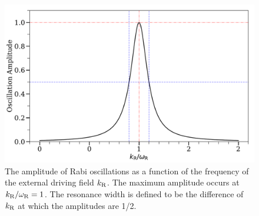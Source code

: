 \begin{figure}[htbp]
    \centering
    \includegraphics[width=\textwidth]{chapters/assets/app/rabi-resonance-width}
    \caption{The amplitude of Rabi oscillations as a function of the frequency of the external driving field $k_\mathrm R$. The maximum amplitude occurs at $k_\mathrm R/\omega_\mathrm R=1$. The resonance width is defined to be the difference of $k_\mathrm R$ at which the amplitudes are 1/2.}
    \label{app-fig:rabi-resonance-width}
\end{figure}


